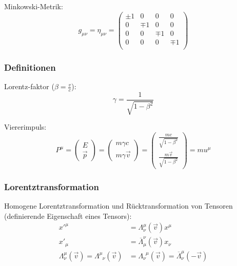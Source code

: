 \documentclass[11pt]{article}
\numberwithin{equation}{section}
\begin{document}
        Minkowski-Metrik:
        \begin{equation}
          g_{\mu\nu} = \eta_{\mu\nu}
          = \left( \begin{matrix}
            \pm1 & 0    & 0    & 0    \\
            0    & \mp1 & 0    & 0    \\
            0    & 0    & \mp1 & 0    \\
            0    & 0    & 0    & \mp1 \\
          \end{matrix} \right)
        \end{equation}

        \subsubsection{Definitionen}
          Lorentz-faktor ($\beta = \frac{v}{c}$):
          \begin{equation}
            \gamma = \frac{1}{\sqrt{1-\beta^2}}
          \end{equation}

          Viererimpuls:
          \begin{equation}
            P^\mu =
            \left(\begin{matrix}
              E \\ \vec{p}
            \end{matrix}\right)
            = \left(\begin{matrix}
              m\gamma c \\ m\gamma\vec{v}
            \end{matrix}\right)
            = \left(\begin{matrix}
              \frac{mc}{\sqrt{1-\beta^2}} \\ \frac{m\vec{v}}{\sqrt{1-\beta^2}}
            \end{matrix}\right)
            = m u^\mu
          \end{equation}

        \subsubsection{Lorentztransformation}
          Homogene Lorentztransformation und Rücktransformation von Tensoren (definierende Eigenschaft eines Tensors):
          \begin{equation}
            \begin{aligned}
              x'^\mu &=          \Lambda^{\mu}_{\nu}(\vec{v}) x^\mu \\
              x'_\mu &= \overline{\Lambda}_\mu^{\nu}(\vec{v}) x_\nu \\
              \Lambda^{\mu}_{\nu}(\vec{v}) = \Lambda^{\mu}_{\phantom{\mu}\nu}(\vec{v}) &= \Lambda^{\phantom{\nu}\mu}_{\nu}(\vec{v}) = \overline{\Lambda}^{\mu}_{\nu}(-\vec{v})
            \end{aligned}
          \end{equation}
\end{document}
